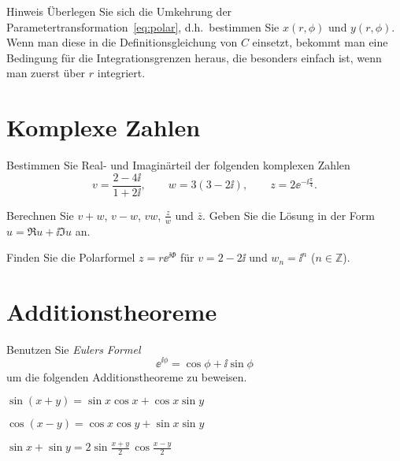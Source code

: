 \documentclass{scrartcl}
\begin{document}
\begin{remark}{Hinweis}
  Überlegen Sie sich die Umkehrung der Parametertransformation~\eqref{eq:polar}, d.h.\ bestimmen Sie $x(r,\phi)$ und $y(r,\phi)$.
  Wenn man diese in die Definitionsgleichung von $C$ einsetzt, bekommt man eine Bedingung für die Integrationsgrenzen heraus, die besonders einfach ist, wenn man zuerst über $r$ integriert. 
\end{remark}


\section{Komplexe Zahlen}
\label{sec:komplexe_zahlen}

\begin{subex}
  \item Bestimmen Sie Real- und Imaginärteil der folgenden komplexen Zahlen
  \[
    v = \frac{2 - 4\ii}{1 + 2\ii}, \quad\quad w = 3(3 - 2\ii), \quad\quad z = 2 \ee^{-\ii \frac{\pi}{4}}.
  \]
  \item Berechnen Sie $v + w$, $v - w$, $vw$, $\frac{z}{w}$ und $\bar z$. 
  Geben Sie die Lösung in der Form $u = \Re u + \ii\Im u$ an.
  \item Finden Sie die Polarformel $z = r \ee^{\ii\Phi}$ für $v = 2 - 2\ii$ und $w_n = \ii^n$ ($n \in \mathbb{Z}$).
\end{subex}


\section{Additionstheoreme}
\label{sec:additionstheoreme}

Benutzen Sie \emph{Eulers Formel}
\[
  \ee^{\ii \phi} = \cos \phi + \ii \sin \phi 
\]
um die folgenden Additionstheoreme zu beweisen.

\begin{subex} 
  \item $\sin(x + y) = \sin x \cos x + \cos x \sin y$
  \item $\cos(x - y) = \cos x \cos y + \sin x \sin y$
  \item $\sin x + \sin y = 2 \sin \frac{x + y}{2} \, \cos \frac{x - y}{2}$
\end{subex}
\end{document}
